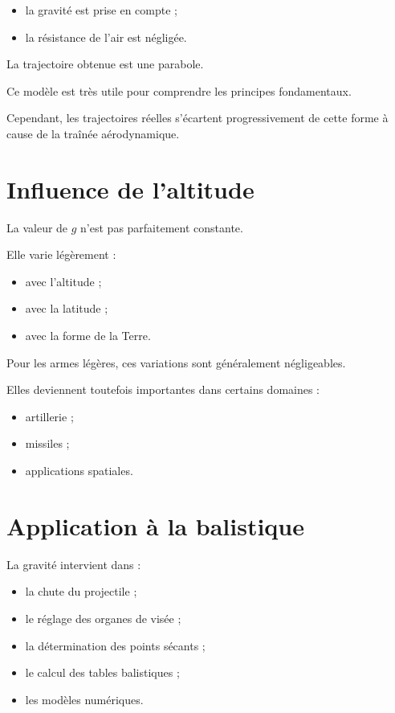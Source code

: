 \begin{itemize}
\item la gravité est prise en compte ;
\item la résistance de l'air est négligée.
\end{itemize}

La trajectoire obtenue est une parabole.

Ce modèle est très utile pour comprendre les principes fondamentaux.

Cependant, les trajectoires réelles s'écartent progressivement de cette forme
à cause de la traînée aérodynamique.

\section{Influence de l'altitude}

La valeur de $g$ n'est pas parfaitement constante.

Elle varie légèrement :

\begin{itemize}
\item avec l'altitude ;
\item avec la latitude ;
\item avec la forme de la Terre.
\end{itemize}

Pour les armes légères, ces variations sont généralement négligeables.

Elles deviennent toutefois importantes dans certains domaines :

\begin{itemize}
\item artillerie ;
\item missiles ;
\item applications spatiales.
\end{itemize}

\section{Application à la balistique}

La gravité intervient dans :

\begin{itemize}
\item la chute du projectile ;
\item le réglage des organes de visée ;
\item la détermination des points sécants ;
\item le calcul des tables balistiques ;
\item les modèles numériques.
\end{itemize}

